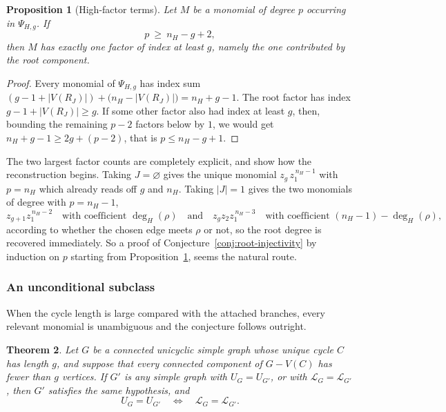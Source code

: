 \documentclass[11pt]{article}
\theoremstyle{plain}
\newtheorem{theorem}{Theorem}[section]
\newtheorem{proposition}[theorem]{Proposition}
\theoremstyle{definition}
\renewcommand{\mathcal}{\mathscr}
\newcommand{\LL}{\mathcal{L}}    %
\numberwithin{equation}{section}
\begin{document}
\begin{proposition}[High-factor terms]\label{prop:unambiguous-terms}
  Let $M$ be a monomial of degree $p$ occurring in $\Psi_{H,g}$.
  If
\[
   p\ \ge\ n_H-g+2,
\]
then $M$ has exactly one factor of index at least $g$, namely the one contributed by the root component.
\end{proposition}

\begin{proof}
Every monomial of $\Psi_{H,g}$ has index sum
$(g-1+|V(R_J)|)+\bigl(n_H-|V(R_J)|\bigr)=n_H+g-1$.  The root factor has index
$g-1+|V(R_J)|\ge g$.  If some other factor also had index at least $g$, then,
bounding the remaining $p-2$ factors below by $1$, we would get
$n_H+g-1\ge 2g+(p-2)$, that is $p\le n_H-g+1$.
\end{proof}

The two largest factor counts are completely explicit, and show how the reconstruction begins.
Taking $J=\varnothing$ gives the unique monomial   $ z_g\,z_1^{\,n_H-1}$  with $p=n_H$
which already reads off $g$ and $n_H$.  Taking $|J|=1$ gives the two monomials of degree
with $p=n_H-1$,
\[
   z_{g+1}z_1^{\,n_H-2}
   \quad\text{with coefficient }\deg_H(\rho)
   \quad \text{and}  \quad  z_g z_2 z_1^{\,n_H-3}
   \quad\text{with coefficient }(n_H-1)-\deg_H(\rho),
\]
according to whether the chosen edge meets $\rho$ or not, so the root degree is
recovered immediately.  So a proof of Conjecture~\ref{conj:root-injectivity} by induction on $p$
starting from Proposition~\ref{prop:unambiguous-terms}, seems the natural route.

\subsubsection*{An unconditional subclass}
When the cycle length is large compared with the attached branches, every relevant monomial
is unambiguous and the conjecture follows outright.


\begin{theorem}\label{thm:unicyclic-separated}
Let $G$ be a connected unicyclic simple graph whose unique cycle $C$ has
length $g$, and suppose that every connected component of $G-V(C)$ has fewer
than $g$ vertices.  If $G'$ is any simple graph with $U_G=U_{G'}$, or with
$\LL_G=\LL_{G'}$, then $G'$ satisfies the same hypothesis, and
\[
   U_G=U_{G'}
   \quad\Longleftrightarrow\quad
   \LL_G=\LL_{G'} .
\]
\end{theorem}
\end{document}

